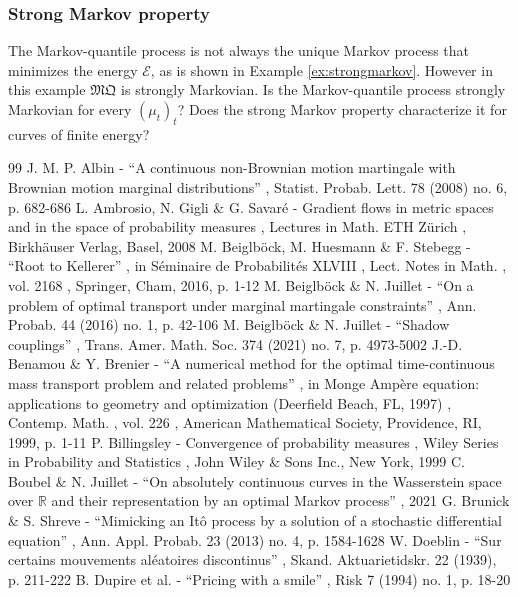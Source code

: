 \documentclass[11pt]{article}
\theoremstyle{plain}
\theoremstyle{definition}
\newcommand{\mq}{\mathfrak{MQ}}
\newcommand{\EE}{{\mathcal E}}
\begin{document}
\subsubsection{Strong Markov property}\label{ss:strong}
The Markov-quantile process is not always the unique Markov process that minimizes the energy $\EE$, as is shown in Example \ref{ex:strongmarkov}. However in this example $\mq$ is strongly Markovian. Is the Markov-quantile process strongly Markovian for every $(\mu_t)_t$? Does the strong Markov property characterize it for curves of finite energy?



\begin{thebibliography}{99}
 J. M. P. Albin - “A continuous non-Brownian motion martingale with Brownian motion marginal distributions” , Statist. Probab. Lett. 78 (2008) no. 6, p. 682-686
 L. Ambrosio, N. Gigli \& G. Savaré - Gradient flows in metric spaces and in the space of probability measures , Lectures in Math. ETH Zürich , Birkhäuser Verlag, Basel, 2008
 M. Beiglböck, M. Huesmann \& F. Stebegg - “Root to Kellerer” , in Séminaire de Probabilités XLVIII , Lect. Notes in Math. , vol. 2168 , Springer, Cham, 2016, p. 1-12
 M. Beiglböck \& N. Juillet - “On a problem of optimal transport under marginal martingale constraints” , Ann. Probab. 44 (2016) no. 1, p. 42-106
 M. Beiglböck \& N. Juillet - “Shadow couplings” , Trans. Amer. Math. Soc. 374 (2021) no. 7, p. 4973-5002
 J.-D. Benamou \& Y. Brenier - “A numerical method for the optimal time-continuous mass transport problem and related problems” , in Monge Ampère equation: applications to geometry and optimization (Deerfield Beach, FL, 1997) , Contemp. Math. , vol. 226 , American Mathematical Society, Providence, RI, 1999, p. 1-11
 P. Billingsley - Convergence of probability measures , Wiley Series in Probability and Statistics , John Wiley \& Sons Inc., New York, 1999
 C. Boubel \& N. Juillet - “On absolutely continuous curves in the Wasserstein space over $\mathbb{R}$ and their representation by an optimal Markov process” , 2021
 G. Brunick \& S. Shreve - “Mimicking an Itô process by a solution of a stochastic differential equation” , Ann. Appl. Probab. 23 (2013) no. 4, p. 1584-1628
 W. Doeblin - “Sur certains mouvements aléatoires discontinus” , Skand. Aktuarietidskr. 22 (1939), p. 211-222
 B. Dupire et al. - “Pricing with a smile” , Risk 7 (1994) no. 1, p. 18-20

\end{thebibliography}
\end{document}
